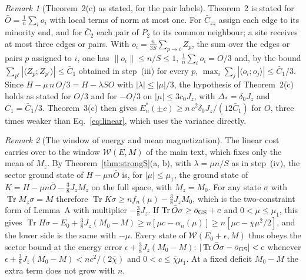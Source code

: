 \documentclass[aps,prx,onecolumn,10pt,nofootinbib,longbibliography,floatfix]{revtex4-2}
\theoremstyle{remark}
\newtheorem*{remark}{Remark}
\newcommand{\Jz}{J_z}
\newcommand{\Czz}{\bar C_{zz}}
\newcommand{\Ctwo}{\bar C_{2}}
\newcommand{\W}{\mathcal{W}}
\newcommand{\Tr}{\operatorname{Tr}}
\begin{document}
\begin{remark}[Theorem~2(c) as stated, for the pair labels] %
Theorem~2 is stated for $\bar O=\frac1n\sum_io_i$ with local terms of norm at most one. For $\Czz$ assign each %
edge to its minority end, and for $\Ctwo$ each pair of $P_2$ to its common neighbour; a site receives at most
three edges or pairs. With $o_i=\frac{n}{3S}\sum_{p\to i}Z_p$, the sum over the edges or pairs $p$ assigned to $i$,
one has $\|o_i\|\le n/S\le1$, $\frac1n\sum_io_i=O/3$ and, by the bound
$\sum_{p'}|\langle Z_p;Z_{p'}\rangle|\le\bar C_1$ obtained in step~(iii) for every $p$,
$\max_i\sum_j|\langle o_i;o_j\rangle|\le\bar C_1/3$. Since $H-\mu\,n\,O/3=H-\lambda SO$ with $|\lambda|\le|\mu|/3$, the
hypothesis of Theorem~2(c) holds as stated for $O/3$ and for $-O/3$ on $|\mu|\le3c_0\Jz$, with %
$\Delta_*=\delta_0\Jz$ and $C_1=\bar C_1/3$. Theorem~3(c) then gives %
$E^*_n(\pm c)\ge n\,c^2\delta_0\Jz/(12\bar C_1)$ for $O$, three times weaker than Eq.~\eqref{eq:linear}, which uses %
the variance directly.
\end{remark}

\begin{remark}[The window of energy and mean magnetization]
The linear cost carries over to the window $\W(E,M)$ of the main text, which fixes only the mean of $M_z$. By
Theorem~\ref{thm:strongS}(a, b), with $\lambda=\mu n/S$ as in step~(iv), the sector ground state of $H-\mu n\bar O$
is, for $|\mu|\le\mu_1$, the ground state of
$K=H-\mu n\bar O-\frac38\Jz M_z$ on the full space, with $M_z=M_0$. For any state $\sigma$ with $\Tr M_z\sigma=M$ %
therefore $\Tr K\sigma\ge nf_n(\mu)-\frac38\Jz M_0$, which is the two-constraint form of Lemma~A with multiplier %
$-\frac38\Jz$. If $\Tr\bar O\sigma\ge\bar o_{\rm GS}+c$ and $0<\mu\le\mu_1$, this gives %
$\Tr H\sigma-E_0+\frac38\Jz(M_0-M)\ge n[\mu c-\alpha_n(\mu)]\ge n[\mu c-\bar\chi\mu^2/2]$, and the lower side is the %
same with $-\mu$. Every state of $\W(E_0+\epsilon,M)$ thus obeys the sector bound at the energy error
$\epsilon+\frac38\Jz(M_0-M)$: $|\Tr\bar O\sigma-\bar o_{\rm GS}|<c$ whenever $\epsilon+\frac38\Jz(M_0-M)<nc^2/(2\bar\chi)$ %
and $0<c\le\bar\chi\mu_1$. At a fixed deficit $M_0-M$ the extra term does not grow with $n$.
\end{remark}
\end{document}
